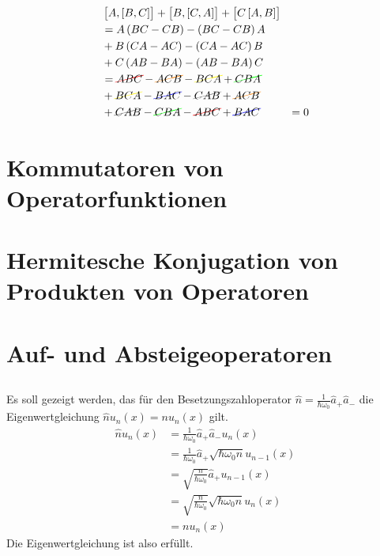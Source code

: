 \begin{align*}
    & \sbr{A,\sbr{B,C}} + \sbr{B,\sbr{C,A}} + \sbr{C\sbr{A,B}}\\
    &= A\del{BC-CB} - \del{BC-CB}A \\
    &+ B\del{CA-AC} - \del{CA-AC}B \\
    &+ C\del{AB-BA} - \del{AB-BA}C \\
    &= \ccancel[red]{ABC} - \ccancel[orange]{ACB} - \ccancel[yellow]{BCA} + \ccancel[green]{CBA} \\
    &+ \ccancel[yellow]{BCA} - \ccancel[blue]{BAC} - \ccancel[gray]{CAB} + \ccancel[orange]{ACB} \\
    &+ \ccancel[gray]{CAB} - \ccancel[green]{CBA} - \ccancel[red]{ABC} + \ccancel[blue]{BAC}
    &= 0
\end{align*}


\section{Kommutatoren von Operatorfunktionen}

\section{Hermitesche Konjugation von Produkten von Operatoren}

\section{Auf- und Absteigeoperatoren}

\subsection{}

\subsection{}

Es soll gezeigt werden, das für den Besetzungszahloperator $\hat n =
\frac1{\hbar\omega_0}\hat a_+\hat a_-$ die Eigenwertgleichung $\hat nu_n(x) =
nu_n(x)$ gilt.
\begin{align*}
    \hat n u_n(x) &= \frac1{\hbar\omega_0}\hat a_+\hat a_- u_n(x) \\
                  &= \frac1{\hbar\omega_0}\hat a_+ \sqrt{\hbar\omega_0n}u_{n-1}(x) \\
                  &= \sqrt{\frac{n}{\hbar\omega_0}} \hat a_+ u_{n-1}(x) \\
                  &= \sqrt{\frac{n}{\hbar\omega_0}} \sqrt{\hbar\omega_0n}u_n(x) \\
                  &= nu_n(x)
\end{align*}
Die Eigenwertgleichung ist also erfüllt.


